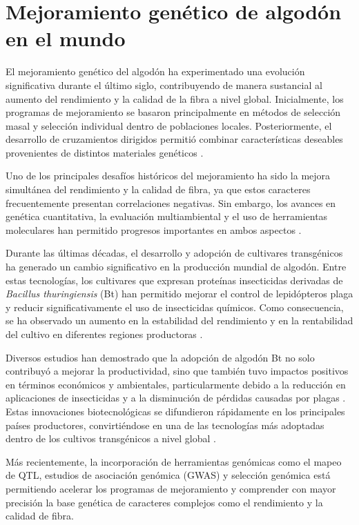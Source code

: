 \documentclass[12pt,oneside]{reedthesis}
\begin{document}
\section{Mejoramiento genético de algodón en el mundo}\label{mejoramiento-genuxe9tico-de-algoduxf3n-en-el-mundo}

El mejoramiento genético del algodón ha experimentado una evolución significativa durante el último siglo, contribuyendo de manera sustancial al aumento del rendimiento y la calidad de la fibra a nivel global. Inicialmente, los programas de mejoramiento se basaron principalmente en métodos de selección masal y selección individual dentro de poblaciones locales. Posteriormente, el desarrollo de cruzamientos dirigidos permitió combinar características deseables provenientes de distintos materiales genéticos \autocite{smith1999}.

Uno de los principales desafíos históricos del mejoramiento ha sido la mejora simultánea del rendimiento y la calidad de fibra, ya que estos caracteres frecuentemente presentan correlaciones negativas. Sin embargo, los avances en genética cuantitativa, la evaluación multiambiental y el uso de herramientas moleculares han permitido progresos importantes en ambos aspectos \autocite{campbell2015}.

Durante las últimas décadas, el desarrollo y adopción de cultivares transgénicos ha generado un cambio significativo en la producción mundial de algodón. Entre estas tecnologías, los cultivares que expresan proteínas insecticidas derivadas de \emph{Bacillus thuringiensis} (Bt) han permitido mejorar el control de lepidópteros plaga y reducir significativamente el uso de insecticidas químicos. Como consecuencia, se ha observado un aumento en la estabilidad del rendimiento y en la rentabilidad del cultivo en diferentes regiones productoras \autocite{qaim2003}.

Diversos estudios han demostrado que la adopción de algodón Bt no solo contribuyó a mejorar la productividad, sino que también tuvo impactos positivos en términos económicos y ambientales, particularmente debido a la reducción en aplicaciones de insecticidas y a la disminución de pérdidas causadas por plagas \autocite{qaim2003}. Estas innovaciones biotecnológicas se difundieron rápidamente en los principales países productores, convirtiéndose en una de las tecnologías más adoptadas dentro de los cultivos transgénicos a nivel global \autocite{james2017}.

Más recientemente, la incorporación de herramientas genómicas como el mapeo de QTL, estudios de asociación genómica (GWAS) y selección genómica está permitiendo acelerar los programas de mejoramiento y comprender con mayor precisión la base genética de caracteres complejos como el rendimiento y la calidad de fibra\autocite{fang2017,yang2023,tan2024}.
\end{document}
